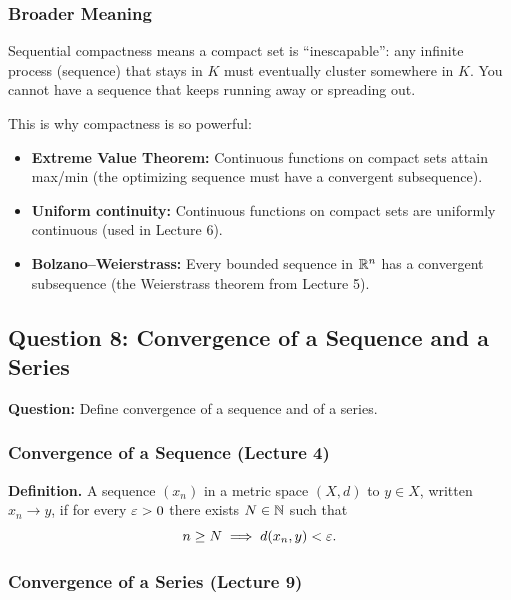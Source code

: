\documentclass[../master/master.tex]{subfiles}
\begin{document}
\subsubsection*{Broader Meaning}

Sequential compactness means a compact set is ``inescapable'': any infinite process (sequence) that stays in $K$ must eventually cluster somewhere in $K$. You cannot have a sequence that keeps running away or spreading out.

This is why compactness is so powerful:
\begin{itemize}
    \item \textbf{Extreme Value Theorem:} Continuous functions on compact sets attain max/min (the optimizing sequence must have a convergent subsequence).
    \item \textbf{Uniform continuity:} Continuous functions on compact sets are uniformly continuous (used in Lecture 6).
    \item \textbf{Bolzano--Weierstrass:} Every bounded sequence in $\mathbb{R}^n$ has a convergent subsequence (the Weierstrass theorem from Lecture 5).
\end{itemize}

\newpage
\subsection{Question 8: Convergence of a Sequence and a Series}

\begin{summarybox}
\textbf{Question:} Define convergence of a sequence and of a series.
\end{summarybox}

\subsubsection*{Convergence of a Sequence (Lecture 4)}

\textbf{Definition.} A sequence $(x_n)$ in a metric space $(X, d)$  to $y \in X$, written $x_n \to y$, if for every $\varepsilon > 0$ there exists $N \in \mathbb{N}$ such that
\[
n \geq N \implies d(x_n, y) < \varepsilon.
\]

\subsubsection*{Convergence of a Series (Lecture 9)}
\end{document}
